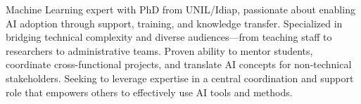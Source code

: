 


\begin{cvparagraph}
Machine Learning expert with PhD from UNIL/Idiap, passionate about enabling AI adoption through support, training, and knowledge transfer. Specialized in bridging technical complexity and diverse audiences—from teaching staff to researchers to administrative teams. Proven ability to mentor students, coordinate cross-functional projects, and translate AI concepts for non-technical stakeholders. Seeking to leverage expertise in a central coordination and support role that empowers others to effectively use AI tools and methods.
\end{cvparagraph}
